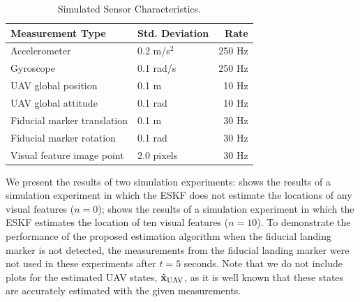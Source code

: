 \begin{table}[h!]
  \begin{center}
    \caption{Simulated Sensor Characteristics.}
    \label{tab:sim_meas_noise}
    \begin{tabular}{l|l|r}
      \textbf{Measurement Type} & \textbf{Std. Deviation} & \textbf{Rate} \\
      \hline
      Accelerometer & 0.2 m/s$^2$ & 250 Hz \\
      Gyroscope & 0.1 rad/s & 250 Hz \\
      UAV global position & 0.1 m & 10 Hz \\
      UAV global attitude & 0.1 rad & 10 Hz \\
      Fiducial marker translation & 0.1 m & 30 Hz \\
      Fiducial marker rotation & 0.1 rad & 30 Hz \\
      Visual feature image point & 2.0 pixels & 30 Hz \\
    \end{tabular}
  \end{center}
\end{table}

We present the results of two simulation experiments:
 shows the results of a simulation experiment in which the ESKF
does not estimate the locations of any visual features ($n = 0$);
 shows the results of a simulation experiment in which
the ESKF estimates the location of ten visual features ($n = 10$).
To demonstrate the performance of the proposed estimation algorithm when the
fiducial landing marker is not detected, the measurements from the fiducial
landing marker were not used in these experiments after $t = 5$
seconds.
Note that we
do not include plots for the estimated UAV states, $\hat{\boldsymbol{\mathrm{x}}}_{\text{UAV}}$,
as it is well known that these states are accurately estimated with the given
measurements.

